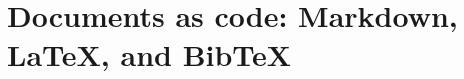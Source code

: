 \chapter{Documents as code: Markdown, LaTeX, and BibTeX}
\label{ch:documents-as-code-markdown-latex-and}

